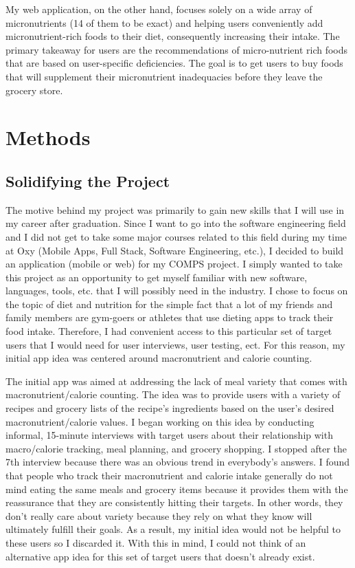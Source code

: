 \documentclass[10pt,twocolumn]{article}
\begin{document}
My web application, on the other hand, focuses solely on a wide array of micronutrients (14 of them to be exact) and helping users conveniently add micronutrient-rich foods to their diet, consequently increasing their intake. The primary takeaway for users are the recommendations of micro-nutrient rich foods that are based on user-specific deficiencies. The goal is to get users to buy foods that will supplement their micronutrient inadequacies before they leave the grocery store. 

\section{Methods}
\subsection{Solidifying the Project}
The motive behind my project was primarily to  gain new skills that I will use in my career after graduation. Since I want to go into the software engineering field and I did not get to take some major courses related to this field during my time at Oxy (Mobile Apps, Full Stack, Software Engineering, etc.), I decided to build an application (mobile or web) for my COMPS project. I simply wanted to take this project as an opportunity to get myself familiar with new software, languages, tools, etc. that I will possibly need in the industry. I chose to focus on the topic of diet and nutrition for the simple fact that a lot of my friends and family members are gym-goers or athletes that use dieting apps to track their food intake. Therefore, I had convenient access to this particular set of target users that I would need for user interviews, user testing, ect. For this reason, my initial app idea was centered around macronutrient and calorie counting. 

The initial app was aimed at addressing the lack of meal variety that comes with macronutrient/calorie counting. The idea was to provide users with a variety of recipes and grocery lists of the recipe's ingredients based on the user’s desired macronutrient/calorie values. I began working on this idea by conducting informal, 15-minute interviews with target users about their relationship with macro/calorie tracking, meal planning, and grocery shopping. I stopped after the 7th interview because there was an obvious trend in everybody’s answers. I found that people who track their macronutrient and calorie intake generally do not mind eating the same meals and grocery items because it provides them with the reassurance that they are consistently hitting their targets. In other words, they don’t really care about variety because they rely on what they know will ultimately fulfill their goals. As a result, my initial idea would not be helpful to these users so I discarded it. With this in mind, I could not think of an alternative app idea for this set of target users that doesn’t already exist. 
\end{document}
